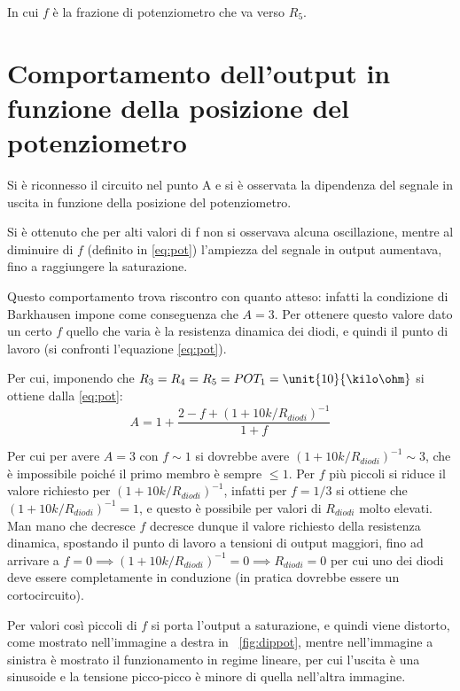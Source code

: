 \documentclass[10pt,a4paper]{article}
\begin{document}
In cui $f$ è la frazione di potenziometro che va verso $R_5$.

\section{Comportamento dell'output in funzione della posizione del potenziometro}
Si è riconnesso il circuito nel punto A e si è osservata la dipendenza del segnale in uscita in funzione della posizione del potenziometro.

Si è ottenuto che per alti valori di f non si osservava alcuna oscillazione, mentre al diminuire di $f$ (definito in \eqref{eq:pot}) l'ampiezza del segnale in output aumentava, fino a raggiungere la saturazione.

Questo comportamento trova riscontro con quanto atteso: infatti la condizione di Barkhausen impone come conseguenza che $A = 3$. Per ottenere questo valore dato un certo $f$ quello che varia è la resistenza dinamica dei diodi, e quindi il punto di lavoro (si confronti l'equazione \eqref{eq:pot}).

Per cui, imponendo che $R_3 = R_4 = R_5 = POT_1 = \unit{10}{\kilo\ohm}$ si ottiene dalla \eqref{eq:pot}:
\begin{equation}
A = 1 + \frac{2 - f + (1 + 10k/R_{diodi})^{-1}}{1+f}
\end{equation}

Per cui per avere $A = 3$ con $f \sim 1$ si dovrebbe avere $(1 + 10k/R_{diodi})^{-1} \sim 3$, che è impossibile poiché il primo membro è sempre $\leq 1$.
Per $f$ più piccoli si riduce il valore richiesto per $(1 + 10k/R_{diodi})^{-1}$, infatti per $f = 1/3$ si ottiene che $(1 + 10k/R_{diodi})^{-1} = 1$, e questo è possibile per valori di $R_{diodi}$ molto elevati. Man mano che decresce $f$ decresce dunque il valore richiesto della resistenza dinamica, spostando il punto di lavoro a tensioni di output maggiori, fino ad arrivare a $f = 0 \implies (1 + 10k/R_{diodi})^{-1} = 0 \implies R_{diodi} = 0$ per cui uno dei diodi deve essere completamente in conduzione (in pratica dovrebbe essere un cortocircuito).

Per valori così piccoli di $f$ si porta l'output a saturazione, e quindi viene distorto, come mostrato nell'immagine a destra in \figurename{~\ref{fig:dippot}}, mentre nell'immagine a sinistra è mostrato il funzionamento in regime lineare, per cui l'uscita è una sinusoide e la tensione picco-picco è minore di quella nell'altra immagine.
\end{document}

